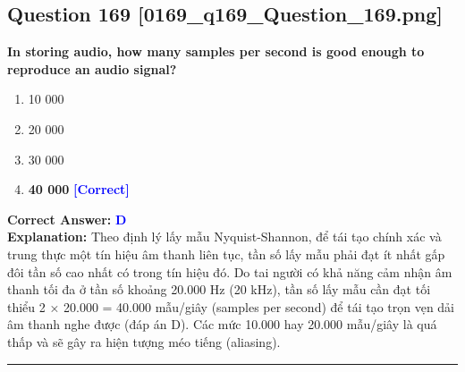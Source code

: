 \documentclass[11pt,a4paper]{article}
\begin{document}
\begin{minipage}{\textwidth}
\subsection*{Question 169 \quad \footnotesize{[0169\_q169\_Question\_169.png]}}
\noindent \textbf{In storing audio, how many samples per second is good enough to reproduce an audio signal?}

\begin{enumerate}[label=\Alph*.]
    \item 10 000
    \item 20 000
    \item 30 000
    \item \textbf{40 000} \hfill \textcolor{blue}{\textbf{[Correct]}}
\end{enumerate}

\noindent \textbf{Correct Answer:} \textcolor{blue}{\textbf{D}} \\[2pt]
\noindent \textbf{Explanation:} Theo định lý lấy mẫu Nyquist-Shannon, để tái tạo chính xác và trung thực một tín hiệu âm thanh liên tục, tần số lấy mẫu phải đạt ít nhất gấp đôi tần số cao nhất có trong tín hiệu đó. Do tai người có khả năng cảm nhận âm thanh tối đa ở tần số khoảng 20.000 Hz (20 kHz), tần số lấy mẫu cần đạt tối thiểu 2 × 20.000 = 40.000 mẫu/giây (samples per second) để tái tạo trọn vẹn dải âm thanh nghe được (đáp án D). Các mức 10.000 hay 20.000 mẫu/giây là quá thấp và sẽ gây ra hiện tượng méo tiếng (aliasing).

\par\vspace{0.3cm}
\hrule
\vspace{0.3cm}
\end{minipage}
\end{document}
